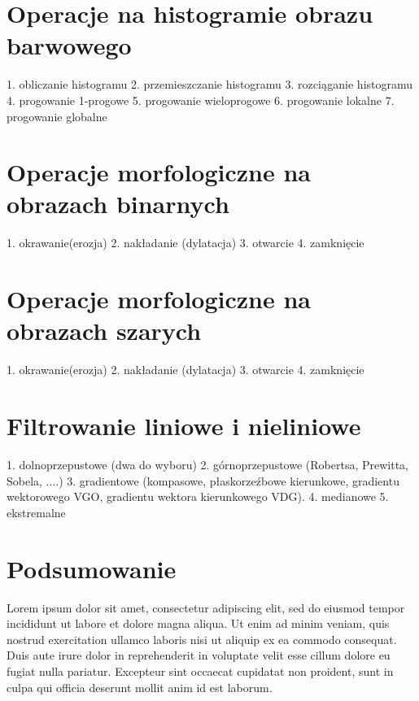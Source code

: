 \documentclass[final,a4paper,openany,12pt]{mwbk}
\begin{document}
\chapter{Operacje na histogramie obrazu barwowego}
1. obliczanie histogramu
2. przemieszczanie histogramu
3. rozciąganie histogramu
4. progowanie 1-progowe
5. progowanie wieloprogowe
6. progowanie lokalne
7. progowanie globalne

\chapter{Operacje morfologiczne na obrazach binarnych}
1. okrawanie(erozja)
2. nakładanie (dylatacja)
3. otwarcie
4. zamknięcie

\chapter {Operacje morfologiczne na obrazach szarych}
1. okrawanie(erozja)
2. nakładanie (dylatacja)
3. otwarcie
4. zamknięcie

\chapter {Filtrowanie liniowe i nieliniowe}
1. dolnoprzepustowe (dwa do wyboru)
2. górnoprzepustowe (Robertsa, Prewitta, Sobela, ....)
3. gradientowe (kompasowe, płaskorzeźbowe kierunkowe, gradientu wektorowego VGO, gradientu
wektora kierunkowego VDG).
4. medianowe
5. ekstremalne

\chapter{Podsumowanie}

Lorem ipsum dolor sit amet, consectetur adipiscing elit, sed do eiusmod tempor incididunt ut labore et dolore magna aliqua. Ut enim ad minim veniam, quis nostrud exercitation ullamco laboris nisi ut aliquip ex ea commodo consequat. Duis aute irure dolor in reprehenderit in voluptate velit esse cillum dolore eu fugiat nulla pariatur. Excepteur sint occaecat cupidatat non proident, sunt in culpa qui officia deserunt mollit anim id est laborum.



\end{document}
